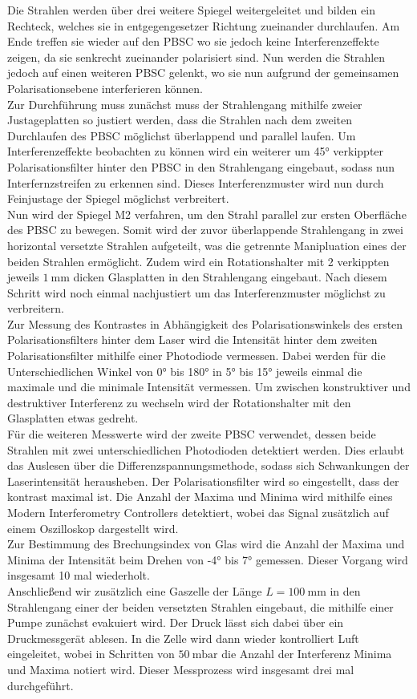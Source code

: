 Die Strahlen werden über drei weitere Spiegel weitergeleitet und bilden ein Rechteck, welches
sie in entgegengesetzer Richtung zueinander durchlaufen. Am Ende treffen sie wieder auf den
PBSC wo sie jedoch keine Interferenzeffekte zeigen, da sie senkrecht zueinander polarisiert sind.
Nun werden die Strahlen jedoch auf einen weiteren PBSC gelenkt, wo sie nun aufgrund der gemeinsamen
Polarisationsebene interferieren können. \\
Zur Durchführung muss zunächst muss der Strahlengang mithilfe zweier Justageplatten so justiert werden,
dass die Strahlen nach dem zweiten Durchlaufen des PBSC möglichst überlappend und parallel laufen.
Um Interferenzeffekte beobachten zu können wird ein weiterer um 45° verkippter
Polarisationsfilter hinter den PBSC in den
Strahlengang eingebaut, sodass nun Interfernzstreifen zu erkennen sind. Dieses Interferenzmuster
wird nun durch Feinjustage der Spiegel möglichst verbreitert. \\
Nun wird der Spiegel M2 verfahren, um den Strahl parallel zur ersten Oberfläche des PBSC zu bewegen.
Somit wird
der zuvor überlappende Strahlengang in zwei horizontal versetzte Strahlen aufgeteilt, was die getrennte
Manipluation eines der beiden Strahlen ermöglicht. Zudem
wird ein Rotationshalter mit  2 verkippten jeweils $\SI{1}{\milli\metre}$ dicken Glasplatten
in den Strahlengang eingebaut.
Nach diesem Schritt wird noch einmal nachjustiert um
das Interferenzmuster möglichst zu verbreitern. \\
Zur Messung des Kontrastes in Abhängigkeit des Polarisationswinkels des ersten
Polarisationsfilters hinter dem Laser wird die Intensität hinter dem zweiten
Polarisationsfilter mithilfe einer Photodiode vermessen. Dabei werden für die Unterschiedlichen Winkel von
0° bis 180° in 5° bis 15° jeweils einmal die maximale und die minimale Intensität vermessen. Um
zwischen konstruktiver und destruktiver Interferenz zu wechseln wird der Rotationshalter mit den Glasplatten
etwas gedreht. \\
Für die weiteren Messwerte wird der zweite PBSC verwendet, dessen beide Strahlen mit zwei unterschiedlichen
Photodioden detektiert werden. Dies erlaubt das Auslesen über die Differenzspannungsmethode,
sodass sich Schwankungen der Laserintensität herausheben. Der Polarisationsfilter wird so eingestellt,
dass der kontrast maximal ist. Die Anzahl der Maxima und Minima wird mithilfe eines
Modern Interferometry Controllers detektiert, wobei das Signal zusätzlich auf einem
Oszilloskop dargestellt wird. \\
Zur Bestimmung des Brechungsindex von Glas wird die Anzahl der Maxima und Minima
der Intensität beim Drehen von -4° bis 7° gemessen. Dieser Vorgang wird insgesamt 10 mal wiederholt.
\\
Anschließend wir zusätzlich eine Gaszelle der Länge $L=\SI{100}{\milli\metre}$
in den Strahlengang einer der beiden versetzten Strahlen
eingebaut, die mithilfe einer Pumpe zunächst evakuiert wird. Der Druck lässt sich dabei
über ein Druckmessgerät ablesen.
In die Zelle wird dann wieder kontrolliert Luft eingeleitet, wobei in Schritten
von $\SI{50}{\milli\bar}$ die Anzahl der Interferenz Minima und Maxima notiert wird. Dieser
Messprozess wird insgesamt drei mal durchgeführt.
